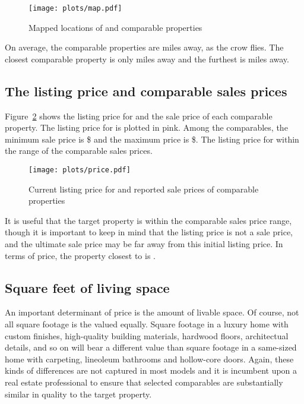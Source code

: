 \documentclass[
12pt, %
letterpaper, %
oneside, %
headinclude,footinclude, %
BCOR5mm, %
]{scrartcl}
\begin{document}
\begin{figure}[h!]
\centering
\caption{Mapped locations of \PropertyName{} and comparable properties}  \label{fig:map}  
\texttt{[image: plots/map.pdf]} 
\end{figure}

On average, the comparable properties are \AvgDistance{} miles away, as the crow flies.
The closest comparable property is only \MinDistance{} miles away and the furthest is \MaxDistance{} miles away.
\States{}
\Cities{}

\subsection{The listing price and comparable sales prices}

Figure~\ref{fig:price} shows the listing price for \textbf{\PropertyName{}} and the sale price of each comparable property.
The listing price for \PropertyName{} is plotted in pink. 
Among the comparables, the minimum sale price is \$\MinPrice{} and the maximum price is \$\MaxPrice{}.
The listing price for \PropertyName{} \InPriceRange{} within the range of the comparable sales prices. 

\begin{figure}[htb]
\centering
\caption{Current listing price for \PropertyName{} and reported sale prices of comparable properties} 
\label{fig:price}  
\texttt{[image: plots/price.pdf]} 
\end{figure}

It is useful that the target property is within the comparable sales price range, though it is important to keep in mind that the listing price is not a sale price, and the ultimate sale price may be far away from this initial listing price.
In terms of price, the property closest to \PropertyName{} is \ClosestOnPrice{}. 

\subsection{Square feet of living space}
An important determinant of price is the amount of livable space.
Of course, not all square footage is the valued equally.
Square footage in a luxury home with custom finishes, high-quality building materials, hardwood floors, architectual details, and so on will bear a different value than square footage in a same-sized home with carpeting, lineoleum bathrooms and hollow-core doors.
Again, these kinds of differences are not captured in most models and it is incumbent upon a real estate professional to ensure that selected comparables are substantially similar in quality to the target property. 
\end{document}
